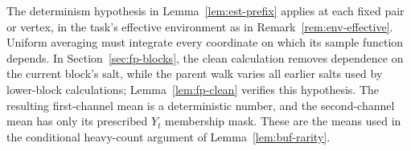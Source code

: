 The determinism hypothesis in Lemma~\ref{lem:est-prefix} applies at
each fixed pair or vertex, in the task's effective environment as in
Remark~\ref{rem:env-effective}.  Uniform averaging must integrate every
coordinate on which its sample function depends.  In
Section~\ref{sec:fp-blocks}, the clean calculation removes dependence
on the current block's salt, while the parent walk varies all earlier
salts used by lower-block calculations; Lemma~\ref{lem:fp-clean}
verifies this hypothesis.  The resulting first-channel mean is a
deterministic number, and the second-channel mean has only its prescribed
$Y_t$ membership mask.  These are the means used in the conditional
heavy-count argument of Lemma~\ref{lem:buf-rarity}.
